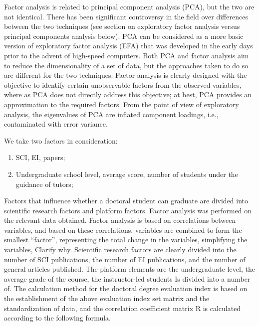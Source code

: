 \documentclass{mcmthesis}
\begin{document}
Factor analysis is related to principal component analysis (PCA), but the two
are not identical. There has been significant controversy in the field over
differences between the two techniques (see section on exploratory factor
analysis versus principal components analysis below). PCA can be considered as a
more basic version of exploratory factor analysis (EFA) that was developed in
the early days prior to the advent of high-speed computers. Both PCA and factor
analysis aim to reduce the dimensionality of a set of data, but the approaches
taken to do so are different for the two techniques. Factor analysis is clearly
designed with the objective to identify certain unobservable factors from the
observed variables, where as PCA does not directly address this objective; at
best, PCA provides an approximation to the required factors. From the point of
view of exploratory analysis, the eigenvalues of PCA are inflated component
loadings, i.e., contaminated with error variance.

We take two factors in consideration:

\begin{enumerate}

	\item SCI, EI, papers;

	\item Undergraduate school level, average score, number of students
		under the guidance of tutors;

\end{enumerate}

Factors that influence whether a doctoral student can graduate are divided into
scientific research factors and platform factors. Factor analysis was performed
on the relevant data obtained. Factor analysis is based on correlations between
variables, and based on these correlations, variables are combined to form the
smallest “factor”, representing the total change in the variables, simplifying
the variables, Clarify why. Scientific research factors are clearly divided into
the number of SCI publications, the number of EI publications, and the number of
general articles published. The platform elements are the undergraduate level,
the average grade of the course, the instructor-led students Is divided into a
number of. The calculation method for the doctoral degree evaluation index is
based on the establishment of the above evaluation index set matrix and the
standardization of data, and the correlation coefficient matrix R is calculated
according to the following formula.
\end{document}
